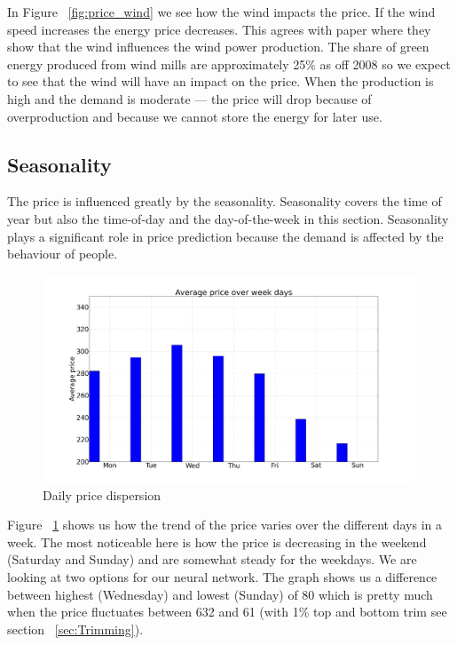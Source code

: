 In Figure ~\ref{fig:price_wind} we see how the wind impacts the price. If the wind speed increases the energy price decreases. This agrees with paper \cite{dayAheadImpactOfWindPowerForecasts} where they show that the wind influences the wind power production. The share of green energy produced from wind mills are approximately 25\% as off 2008\cite{windPowerDanishLiberalized} so we expect to see that the wind will have an impact on the price. When the production is high and the demand is moderate --- the price will drop because of overproduction and because we cannot store the energy for later use.

\subsection{Seasonality}\label{sec:seasonality}
The price is influenced greatly by the seasonality. Seasonality covers the time of year but also the time-of-day and the day-of-the-week in this section. Seasonality plays a significant role in price prediction because the demand is affected by the behaviour of people.

\begin{figure}[H]
\centering
\includegraphics[width=0.99\textwidth ]{billeder/energy_price_plots/Average_price_over_weekdays.png}
\caption{Daily price dispersion}
\label{fig:price_over_weekdays}
\end{figure}

Figure ~\ref{fig:price_over_weekdays} shows us how the trend of the price varies over the different days in a week. The most noticeable here is how the price is decreasing in the weekend (Saturday and Sunday) and are somewhat steady for the weekdays. We are looking at two options for our neural network. The graph shows us a difference between highest (Wednesday) and lowest (Sunday) of 80 which is pretty much when the price fluctuates between 632 and 61 (with 1\% top and bottom trim see section ~\ref{sec:Trimming}).

